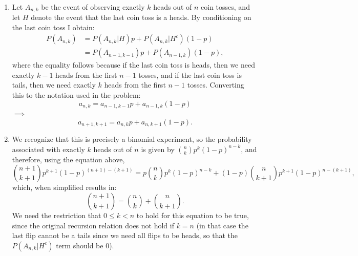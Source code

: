 \begin{problem}{2} $ $

	\begin{enumerate}
		\item Let $A_{n,k}$ be the event of observing exactly $k$ heads out of $n$ coin tosses, and let $H$ denote the event that the last coin toss is a heads.  By conditioning on the last coin toss I obtain:
		\begin{align*}
		P(A_{n, k}) &= P(A_{n, k}|H)p+P(A_{n, k}|H^c)(1-p) \\
		&= P(A_{n-1, k-1})p+P(A_{n-1, k})(1-p),
		\end{align*}
where the equality follows because if the last coin toss is heads, then we need exactly $k-1$ heads from the first $n-1$ tosses, and if the last coin toss is tails, then we need exactly $k$ heads from the first $n-1$ tosses.  Converting this to the notation used in the problem:
		\begin{equation*}
		a_{n,k}= a_{n-1, k-1}p+a_{n-1, k}(1-p)
		\end{equation*}
$\implies$
		\begin{equation*}
		a_{n+1,k+1}= a_{n, k}p+a_{n, k+1}(1-p).
		\end{equation*}

\item We recognize that this is precisely a binomial experiment, so the probability associated with exactly $k$ heads out of $n$ is given by $\binom{n}{k} p^k (1-p)^{n-k}$, and therefore, using the equation above,
		\begin{equation*}
		\binom{n+1}{k+1} p^{k+1} (1-p)^{(n+1)-(k+1)}= p\binom{n}{k} p^k (1-p)^{n-k}+(1-p)\binom{n}{k+1} p^{k+1} (1-p)^{n-(k+1)},
		\end{equation*}
which, when simplified results in:
		\begin{equation*}
		\binom{n+1}{k+1}= \binom{n}{k}+\binom{n}{k+1}.
		\end{equation*}
We need the restriction that $0 \le k <n$ to hold for this equation to be true, since the original recursion relation does not hold if $k = n$ (in that case the last flip cannot be a tails since we need all flips to be heads, so that the $P(A_{n, k}|H^c)$ term should be 0).
\end{enumerate}
\end{problem}

